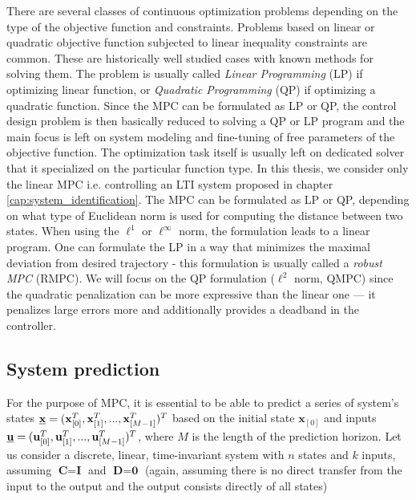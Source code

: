 There are several classes of continuous optimization problems depending on the type of the objective function and constraints. Problems based on linear or quadratic objective function subjected to linear inequality constraints are common. These are historically well studied cases with known methods for solving them. The problem is usually called \textit{Linear Programming} (LP) if optimizing linear function, or \textit{Quadratic Programming} (QP) if optimizing a quadratic function. Since the MPC can be formulated as LP or QP, the control design problem is then basically reduced to solving a QP or LP program and the main focus is left on system modeling and fine-tuning of free parameters of the objective function. The optimization task itself is usually left on dedicated solver that it specialized on the particular function type. In this thesis, we consider only the linear MPC i.e. controlling an LTI system proposed in chapter \ref{cap:system_identification}. The MPC can be formulated as LP or QP, depending on what type of Euclidean norm is used for computing the distance between two states. When using the \mbox{\emph{$\ell^1$}} or \mbox{\emph{$\ell^\infty$}} norm, the formulation leads to a linear program. One can formulate the LP in a way that minimizes the maximal deviation from desired trajectory - this formulation is usually called a \emph{robust MPC} (RMPC). We will focus on the QP formulation (\mbox{\emph{$\ell^2$}} norm, QMPC) since the quadratic penalization can be more expressive than the linear one --- it penalizes large errors more and additionally provides a deadband in the controller.

\subsection{System prediction}

For the purpose of MPC, it is essential to be able to predict a series of system's states $\textbf{\underline{x}} = (\textbf{x}_{[0]}^T, \textbf{x}_{[1]}^T, ..., \textbf{x}_{[M-1]}^T)^T$ based on the initial state $\textbf{x}_{[0]}$ and inputs $\textbf{\underline{u}} = (\textbf{u}_{[0]}^T, \textbf{u}_{[1]}^T, ..., \textbf{u}_{[M-1]}^T)^T$, where $M$ is the length of the prediction horizon. Let us consider a discrete, linear, time-invariant system with $n$ states and $k$ inputs, assuming $\textbf{C} = \textbf{I}$ and $\textbf{D} = \textbf{0}$ (again, assuming there is no direct transfer from the input to the output and the output consists directly of all states)

